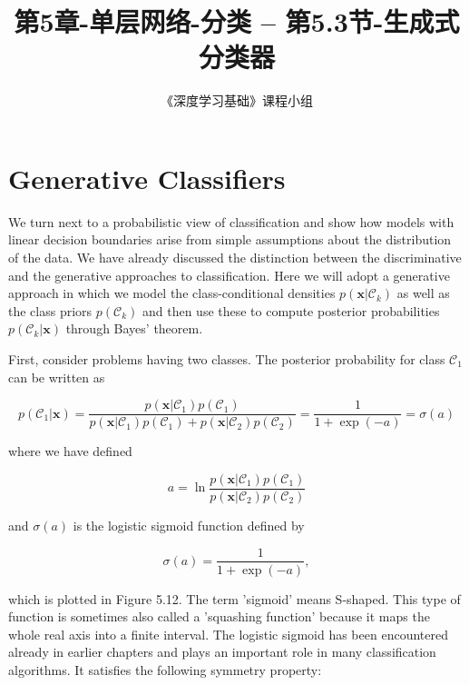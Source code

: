 \documentclass{article}
\title{第5章-单层网络-分类 -- 第5.3节-生成式分类器}
\author{《深度学习基础》课程小组}
\begin{document}
\maketitle
\tableofcontents

\section{Generative Classifiers}

We turn next to a probabilistic view of classification and show how models with linear decision boundaries arise from simple assumptions about the distribution of the data. We have already discussed the distinction between the discriminative and the generative approaches to classification. Here we will adopt a generative approach in which we model the class-conditional densities $p(\mathbf{x}|\mathcal{C}_{k})$ as well as the class priors $p(\mathcal{C}_{k})$ and then use these to compute posterior probabilities $p(\mathcal{C}_{k}|\mathbf{x})$ through Bayes' theorem.

First, consider problems having two classes. The posterior probability for class $\mathcal{C}_{1}$ can be written as

\begin{equation}
p(\mathcal{C}_{1}|\mathbf{x}) = \frac{p(\mathbf{x}|\mathcal{C}_{1})p(\mathcal{C}_{1})}{p(\mathbf{x}|\mathcal{C}_{1})p(\mathcal{C}_{1})+p(\mathbf{x}|\mathcal{C}_{2})p(\mathcal{C}_{2})} = \frac{1}{1+\exp(-a)}=\sigma(a)
\tag{5.40}
\end{equation}

where we have defined

\begin{equation}
a=\ln\frac{p(\mathbf{x}|\mathcal{C}_{1})p(\mathcal{C}_{1})}{p(\mathbf{x}|\mathcal{C}_{2})p(\mathcal{C}_{2})}
\tag{5.41}
\end{equation}

and $\sigma(a)$ is the logistic sigmoid function defined by

\begin{equation}
\sigma(a)=\frac{1}{1+\exp(-a)},
\tag{5.42}
\end{equation}

which is plotted in Figure 5.12. The term 'sigmoid' means S-shaped. This type of function is sometimes also called a 'squashing function' because it maps the whole real axis into a finite interval. The logistic sigmoid has been encountered already in earlier chapters and plays an important role in many classification algorithms. It satisfies the following symmetry property:
\end{document}
